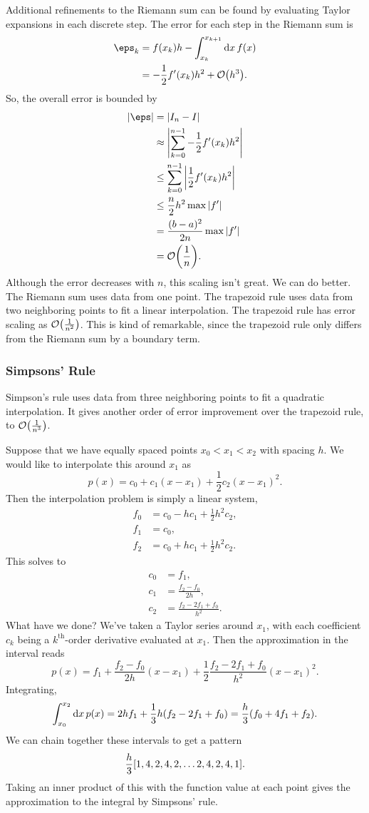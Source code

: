 \documentclass[12pt,letterpaper]{article}
\begin{document}
Additional refinements to the Riemann sum can be found by evaluating Taylor expansions in each discrete step. The error for each step in the Riemann sum is
\begin{align*}
    \eps_k&=f(x_k)h-\int_{x_k}^{x_{k+1}}\dd{x}f(x)\\
    &=-\frac12f'(x_k)h^2+\order{h^3}.
\end{align*}
So, the overall error is bounded by
\begin{align*}
    \abs{\eps}&=\abs{I_n-I}\\
    &\approx\abs{\sum_{k=0}^{n-1}-\frac12f'(x_k)h^2}\\
    &\leq\sum_{k=0}^{n-1}\abs{\frac12f'(x_k)h^2}\\
    &\leq\frac n2h^2\max{\abs{f'}}\\
    &=\frac{(b-a)^2}{2n}\max{\abs{f'}}\\
    &=\order{\frac 1n}.
\end{align*}
Although the error decreases with $n$, this scaling isn't great. We can do better. The Riemann sum uses data from one point. The trapezoid rule uses data from two neighboring points to fit a linear interpolation. The trapezoid rule has error scaling as $\order{\frac 1{n^2}}$. This is kind of remarkable, since the trapezoid rule only differs from the Riemann sum by a boundary term.
\subsubsection{Simpsons' Rule}
Simpson's rule uses data from three neighboring points to fit a quadratic interpolation. It gives another order of error improvement over the trapezoid rule, to $\order{\frac 1{n^3}}$.

Suppose that we have equally spaced points $x_0<x_1<x_2$ with spacing $h$. We would like to interpolate this around $x_1$ as
\[p(x)=c_0+c_1(x-x_1)+\frac12c_2(x-x_1)^2.\]
Then the interpolation problem is simply a linear system,
\begin{align*}
    f_0&=c_0-hc_1+\frac12h^2c_2,\\
    f_1&=c_0,\\
    f_2&=c_0+hc_1+\frac12h^2c_2.
\end{align*}
This solves to
\begin{align*}
    c_0&=f_1,\\
    c_1&=\frac{f_2-f_0}{2h},\\
    c_2&=\frac{f_2-2f_1+f_0}{h^2}.
\end{align*}
What have we done? We've taken a Taylor series around $x_1$, with each coefficient $c_k$ being a $k^{\text{th}}$-order derivative evaluated at $x_1$. Then the approximation in the interval reads
\[p(x)=f_1+\frac{f_2-f_0}{2h}(x-x_1)+\frac12\frac{f_2-2f_1+f_0}{h^2}(x-x_1)^2.\]
Integrating,
\[\int_{x_0}^{x_2}\dd{x}p(x)=2hf_1+\frac13h(f_2-2f_1+f_0)=\frac h3\qty(f_0+4f_1+f_2).\]
We can chain together these intervals to get a pattern
\[\frac h3\qty[1,4,2,4,2,\dotsc2,4,2,4,1].\]
Taking an inner product of this with the function value at each point gives the approximation to the integral by Simpsons' rule.
\end{document}
